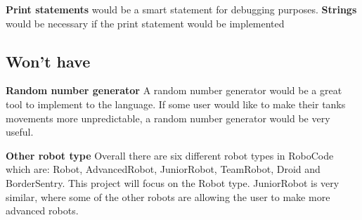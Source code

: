 \textbf{Print statements} would be a smart statement for debugging purposes.
\textbf{Strings} would be necessary if the print statement would be implemented

\subsection{Won't have}
\textbf{Random number generator}
A random number generator would be a great tool to implement to the language. If some user would like to make their tanks movements more unpredictable, a random number generator would be very useful.

\textbf{Other robot type}
Overall there are six different robot types in RoboCode which are: Robot, AdvancedRobot, JuniorRobot, TeamRobot, Droid and BorderSentry. This project will focus on the Robot type. JuniorRobot is very similar, where some of the other robots are allowing the user to make more advanced robots. 
